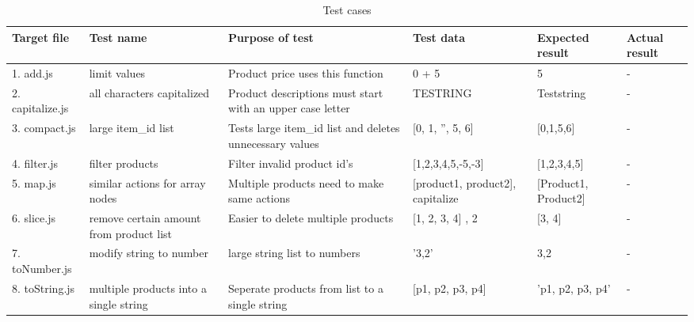 \documentclass[a4paper, 12pt]{article}
\begin{document}
  
            \begin{table}[h]\caption{Test cases}\label{testTable}
                \begin{tabular}{|p{1.5cm}|p{2cm}|p{4cm}|p{2cm}|p{2cm}|p{1.5cm}|}    \hline
                Target file      & Test name                               & Purpose of test                                            & Test data                                      & Expected result          & Actual result \\ \hline
                1. add.js        & limit values                            & Product price uses this function                           & 0 + 5                                          & 5                        & -             \\ \hline
                2. capitalize.js & all characters capitalized              & Product descriptions must start with an upper case letter  & TESTRING                                       & Teststring               & -             \\ \hline
                3. compact.js    & large item\_id list                     & Tests large item\_id list and deletes unnecessary values   & {[}0, 1, '', 5, 6{]}                           & {[}0,1,5,6{]}            & -             \\ \hline
                4. filter.js     & filter products                         & Filter invalid product id's                                & {[}1,2,3,4,5,-5,-3{]}                          & {[}1,2,3,4,5{]}          & -             \\ \hline
                5. map.js        & similar actions for array nodes         & Multiple products need to make same actions                & {[}product1, product2{]}, capitalize         & {[}Product1, Product2{]} & -             \\ \hline
                6. slice.js      & remove certain amount from product list & Easier to delete multiple products                         & {[}1, 2, 3, 4{]} , 2 & {[}3, 4{]}               & -             \\ \hline
                7. toNumber.js   & modify string to number                 & large string list to numbers                               & '3,2'                                          & 3,2                      & -             \\ \hline
                8. toString.js   & multiple products into a single string  & Seperate products from list to a single string             & {[}p1, p2, p3, p4{]}                           & 'p1, p2, p3, p4'         & -             \\ \hline

\end{tabular}
\end{table}
\end{document}
